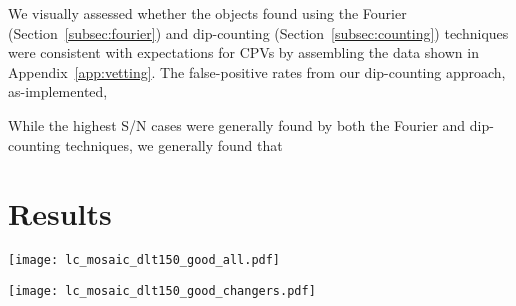 \documentclass[11pt,twocolumn,tighten]{aastex63}
\begin{document}
We visually assessed whether the objects found using the Fourier
(Section~\ref{subsec:fourier}) and dip-counting
(Section~\ref{subsec:counting}) techniques were consistent with 
expectations for CPVs by assembling 
the data shown in Appendix~\ref{app:vetting}.
The false-positive rates from our dip-counting approach, as-implemented,


While
the highest S/N cases were generally found by both the Fourier and dip-counting
techniques, we
generally found that 




\section{Results}
\label{sec:results}



\begin{figure*}[!tp]
	\begin{center}
    \centering
    \texttt{[image: lc\_mosaic\_dlt150\_good\_all.pdf]}
		\caption{
			{\bf CPVs from a search of the TESS 2-minute data at
      $d$$<$150\,pc, acquired between July~2018 and Sep~2022.}
      Phased TESS light curves over 1 month are shown for 40 CPVs;
      they include the brightest and closest examples of CPVs known
      ($V$=14; $J$=9.5; $d$=25\,pc).  Gray are raw 2-minute data;
      black bins to 300 points per cycle.  Periods in hours are listed
      in the lower right corners of each panel.
      The TIC identification numbers and sectors are listed in
      Table~\ref{tab:thetable}.
		}
		\label{fig:revolution}
	\end{center}
\end{figure*}

\begin{figure*}[!t]
	\begin{center}
			\centering
			\texttt{[image: lc\_mosaic\_dlt150\_good\_changers.pdf]}
		\vspace{-0.2cm}
		\caption{
		{\bf Evolution of CPVs}: ``Before and
      after'' for six CPVs from Figure~\ref{fig:revolution}.  Panels
      in the top two rows are separated by two years
      ($\approx$$10^3$ cycles); each panel shows one month.
      Periods are listed in hours. 
      {\bf todo: make these for everything.}
		}
		\label{fig:evoln}
	\end{center}
\end{figure*}
\end{document}
